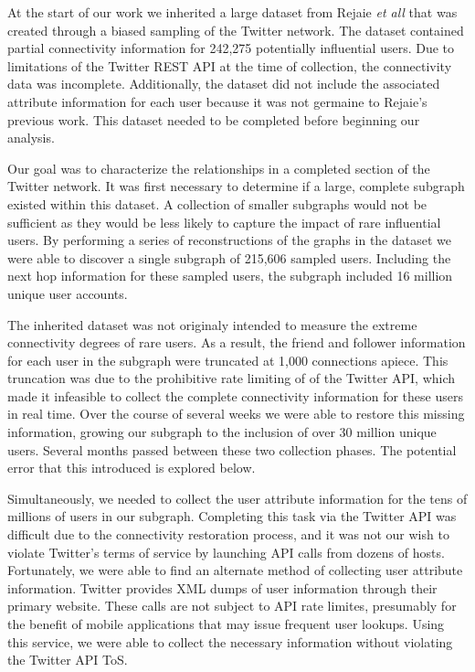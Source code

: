 At the start of our work we inherited a large dataset from Rejaie \textit{et all} that was created through a biased sampling of the Twitter network.  The dataset contained partial connectivity information for 242,275 potentially influential users.  Due to limitations of the Twitter REST API at the time of collection, the connectivity data was incomplete.  Additionally, the dataset did not include the associated attribute information for each user because it was not germaine to Rejaie's previous work.  This dataset needed to be completed before beginning our analysis.

Our goal was to characterize the relationships in a completed section of the Twitter network.  It was first necessary to determine if a large, complete subgraph existed within this dataset.  A collection of smaller subgraphs would not be sufficient as they would be less likely to capture the impact of rare influential users.  By performing a series of reconstructions of the graphs in the dataset we were able to discover a single subgraph of 215,606 sampled users.  Including the next hop information for these sampled users, the subgraph included 16 million unique user accounts.

The inherited dataset was not originaly intended to measure the extreme connectivity degrees of rare users.  As a result, the friend and follower information for each user in the subgraph were truncated at 1,000 connections apiece.  This truncation was due to the prohibitive rate limiting of of the Twitter API, which made it infeasible to collect the complete connectivity information for these users in real time.  Over the course of several weeks we were able to restore this missing information, growing our subgraph to the inclusion of over 30 million unique users.  Several months passed between these two collection phases.  The potential error that this introduced is explored below.

Simultaneously, we needed to collect the user attribute information for the tens of millions of users in our subgraph.  Completing this task via the Twitter API was difficult due to the connectivity restoration process, and it was not our wish to violate Twitter's terms of service by launching API calls from dozens of hosts.  Fortunately, we were able to find an alternate method of collecting user attribute information.  Twitter provides XML dumps of user information through their primary website.  These calls are not subject to API rate limites, presumably for the benefit of mobile applications that may issue frequent user lookups.  Using this service, we were able to collect the necessary information without violating the Twitter API ToS.


